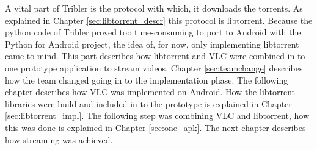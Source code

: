 A vital part of Tribler is the protocol with which, it downloads the torrents. As explained in Chapter \ref{sec:libtorrent_descr} this protocol is libtorrent. Because the python code of Tribler proved too time-consuming to port to Android with the Python for Android project, the idea of, for now, only implementing libtorrent came to mind.
This part describes how libtorrent and VLC were combined in to one prototype application to stream videos. Chapter \ref{sec:teamchange} describes how the team changed going in to the implementation phase. The following chapter describes how VLC was implemented on Android. How the libtorrent libraries were build and included in to the prototype is explained in Chapter \ref{sec:libtorrent_impl}. The following step was combining VLC and libtorrent, how this was done is explained in Chapter \ref{sec:one_apk}. The next chapter describes how streaming was achieved.